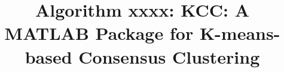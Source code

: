 \documentclass[acmsmall,screen,review]{acmart}
\begin{document}
\title[Algorithm xxxx: KCC: A MATLAB Package for K-means-based Consensus Clustering]{Algorithm xxxx: KCC: A MATLAB Package for K-means-based Consensus Clustering}







\renewcommand{\shortauthors}{Lin et al.}
\end{document}

